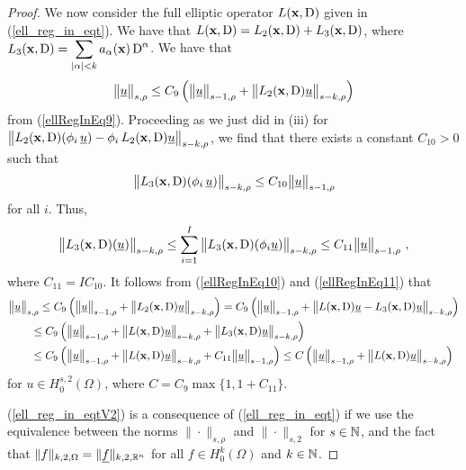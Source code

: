 \begin{proof}
 We now consider the full elliptic operator
$L(\mathbf{x},\operatorname{D})$ given in (\ref{ell_reg_in_eqt}).  We have that
$L(\mathbf{x},\operatorname{D}) = L_2(\mathbf{x},\operatorname{D}) + L_3(\mathbf{x},\operatorname{D})$, where
$\displaystyle L_3(\mathbf{x},\operatorname{D})
= \sum_{|\alpha|< k} a_\alpha(\mathbf{x}) \operatorname{D}^\alpha$.
We have that
\begin{equation} \label{ellRegInEq10}
\big\|\underline{u}\big\|_{s,\rho} \leq C_9
\left( \big\|\underline{u}\big\|_{s-1,\rho} +
\big\|L_2(\mathbf{x},\operatorname{D})\underline{u}\big\|_{s-k,\rho} \right)
\end{equation}
from (\ref{ellRegInEq9}).  Proceeding as we just did in (iii) for
$\displaystyle \big\|L_2(\mathbf{x},\operatorname{D})(\phi_i\,\underline{u})
- \phi_i\, L_2(\mathbf{x},\operatorname{D})\underline{u} \big\|_{s-k,\rho}$, we find
that there exists a constant $C_{10}>0$ such that
\[
 \big\| L_3(\mathbf{x},\operatorname{D})(\phi_i\,\underline{u}) \big\|_{s-k,\rho}
\leq C_{10} \big\|\underline{u}\big\|_{s-1,\rho}
\]
for all $i$.  Thus,
\begin{equation} \label{ellRegInEq11}
\big\| L_3(\VEC{x},\diff)(\underline{u}) \big\|_{s-k,\rho}
\leq \sum_{i=1}^I \big\| L_3(\VEC{x},\diff)(\phi_i \underline{u})
\big\|_{s-k,\rho} \leq C_{11} \big\|\underline{u}\big\|_{s-1,\rho} \ ,
\end{equation}
where $C_{11} = I C_{10}$.  It follows from (\ref{ellRegInEq10}) and
(\ref{ellRegInEq11}) that
\begin{align*}
&\big\|\underline{u}\big\|_{s,\rho}
\leq C_9 \left( \big\|\underline{u}\big\|_{s-1,\rho} +
\big\|L_2(\mathbf{x},\operatorname{D})\underline{u}\big\|_{s-k,\rho} \right)
= C_9 \left( \big\|\underline{u}\big\|_{s-1,\rho} +
\big\|L(\mathbf{x},\operatorname{D})\underline{u}
- L_3(\mathbf{x},\operatorname{D})\underline{u}\big\|_{s-k,\rho} \right) \\
&\qquad \leq C_9 \left( \big\|\underline{u}\big\|_{s-1,\rho} +
\big\|L(\mathbf{x},\operatorname{D})\underline{u}\big\|_{s-k,\rho} +
\big\|L_3(\mathbf{x},\operatorname{D})\underline{u}\big\|_{s-k,\rho} \right) \\
&\qquad \leq C_9 \left( \big\|\underline{u}\big\|_{s-1,\rho} +
\big\|L(\mathbf{x},\operatorname{D})\underline{u}\big\|_{s-k,\rho} +
C_{11} \big\|\underline{u}\big\|_{s-1,\rho} \right)
\leq C \left( \big\|\underline{u}\big\|_{s-1,\rho} +
\big\|L(\mathbf{x},\operatorname{D})\underline{u}\big\|_{s-k,\rho} \right)
\end{align*}
for $u \in H^{s,2}_0(\Omega)$, where $C = C_9 \max\{1, 1+C_{11}\}$.

 (\ref{ell_reg_in_eqtV2}) is a consequence of
(\ref{ell_reg_in_eqt}) if we use the equivalence between the norms
$\|\cdot\|_{s,\rho}$ and $\|\cdot\|_{s,2}$ for $s\in \mathbb{N}$, and the
fact that $\|f\|_{k,2,\Omega} = \|\underline{f}\|_{k,2,\mathbb{R}^n}$ for all
$\displaystyle f \in H^k_0(\Omega)$ and $k \in \mathbb{N}$.
\end{proof}

